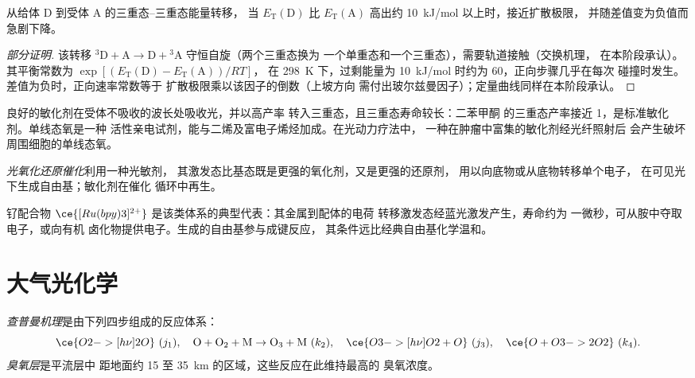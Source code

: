 \begin{proposition}[三重态转移的能量条件]\label{prop:b3:photochemistry:sensitisation-condition}
从给体 D 到受体 A 的三重态–三重态能量转移，
当 $E_{\mathrm T}(\mathrm D)$ 比 $E_{\mathrm T}(\mathrm A)$ 高出约 \qty{10}{kJ/mol} 以上时，接近扩散极限，
并随差值变为负值而急剧下降。
\end{proposition}

\begin{proof}[部分证明]
该转移 ${}^3\mathrm D + \mathrm A \to \mathrm D + {}^3\mathrm A$ 守恒自旋（两个三重态换为
一个单重态和一个三重态），需要轨道接触（交换机理，
在本阶段承认）。其平衡常数为 $\exp[(E_{\mathrm T}(\mathrm D) - E_{\mathrm T}(\mathrm A))/RT]$，
在 \qty{298}{K} 下，过剩能量为 \qty{10}{kJ/mol} 时约为 60，正向步骤几乎在每次
碰撞时发生。差值为负时，正向速率常数等于
扩散极限乘以该因子的倒数（上坡方向
需付出玻尔兹曼因子）；定量曲线同样在本阶段承认。
\end{proof}

良好的敏化剂在受体不吸收的波长处吸收光，并以高产率
转入三重态，且三重态寿命较长：二苯甲酮
的三重态产率接近 1，是标准敏化剂。单线态氧是一种
活性亲电试剂，能与二烯及富电子烯烃加成。在光动力疗法中，
一种在肿瘤中富集的敏化剂经光纤照射后
会产生破坏周围细胞的单线态氧。

\begin{definition}[光氧化还原催化]\label{def:b3:photochemistry:photoredox}
\emph{光氧化还原催化}利用一种光敏剂，
其激发态比基态既是更强的氧化剂，又是更强的还原剂，
用以向底物或从底物转移单个电子，
在可见光下生成自由基；敏化剂在催化
循环中再生。
\end{definition}

钌配合物 $\ce{[Ru(bpy)3]^{2+}}$ 是该类体系的典型代表：其金属到配体的电荷
转移激发态经蓝光激发产生，寿命约为
一微秒，可从胺中夺取电子，或向有机
卤化物提供电子。生成的自由基参与成键反应，
其条件远比经典自由基化学温和。

\section{大气光化学}

\begin{definition}\label{def:b3:photochemistry:chapman}
\emph{查普曼机理}是由下列四步组成的反应体系：
\[
  \ce{O2 ->[h\nu] 2 O}\ (j_1), \quad \mathrm{O + O_2 + M \to O_3 + M}\ (k_2), \quad
  \ce{O3 ->[h\nu] O2 + O}\ (j_3), \quad \ce{O + O3 -> 2 O2}\ (k_4).
\]
\emph{臭氧层}是平流层中
距地面约 15 至 \qty{35}{km} 的区域，这些反应在此维持最高的
臭氧浓度。
\end{definition}

